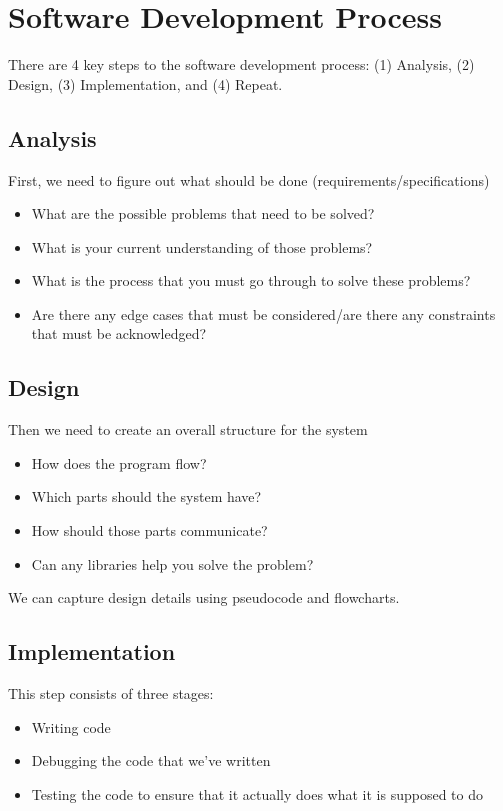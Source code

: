 \documentclass{article}
\begin{document}
	\section{Software Development Process}
	
	There are 4 key steps to the software development process: (1) Analysis, (2) Design, (3) Implementation, and (4) Repeat.

	\subsection{Analysis}

	First, we need to figure out what should be done (requirements/specifications)
	\begin{itemize}
		\item What are the possible problems that need to be solved?
		\item What is your current understanding of those problems?
		\item What is the process that you must go through to solve these problems?
		\item Are there any edge cases that must be considered/are there any constraints that must be acknowledged?
	\end{itemize}

	\subsection{Design}
	
	Then we need to create an overall structure for the system
	\begin{itemize}
		\item How does the program flow?
		\item Which parts should the system have?
		\item How should those parts communicate?
		\item Can any libraries help you solve the problem?
	\end{itemize}
	
	We can capture design details using pseudocode and flowcharts.
	
	\subsection{Implementation}
	
	This step consists of three stages:
	\begin{itemize}
		\item Writing code
		\item Debugging the code that we've written
		\item Testing the code to ensure that it actually does what it is supposed to do
	\end{itemize}
\end{document}
